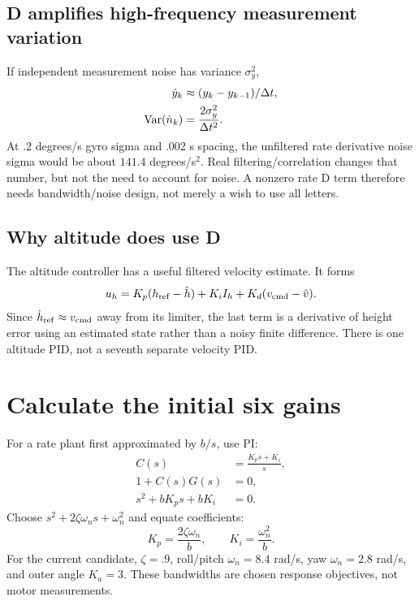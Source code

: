 \subsection{D amplifies high-frequency measurement variation}
If independent measurement noise has variance $\sigma_y^2$,
\begin{align}
\dot y_k&\approx(y_k-y_{k-1})/\Delta t,\\
\operatorname{Var}(\dot n_k)&=\frac{2\sigma_y^2}{\Delta t^2}.
\end{align}
At .2 degrees/s gyro sigma and .002 s spacing, the unfiltered rate derivative
noise sigma would be about $141.4$ degrees/s$^2$. Real filtering/correlation
changes that number, but not the need to account for noise. A nonzero rate D
term therefore needs bandwidth/noise design, not merely a wish to use all letters.

\subsection{Why altitude does use D}
The altitude controller has a useful filtered velocity estimate. It forms
\begin{equation}
u_h=K_p(h_{\rm ref}-\hat h)+K_iI_h+K_d(v_{\rm cmd}-\hat v).
\end{equation}
Since $\dot h_{\rm ref}\approx v_{\rm cmd}$ away from its limiter, the last term
is a derivative of height error using an estimated state rather than a noisy
finite difference. There is one altitude PID, not a seventh separate velocity PID.

\section{Calculate the initial six gains}
For a rate plant first approximated by $b/s$, use PI:
\begin{align}
C(s)&=\frac{K_ps+K_i}{s},\\
1+C(s)G(s)&=0,\\
s^2+bK_ps+bK_i&=0.
\end{align}
Choose $s^2+2\zeta\omega_ns+\omega_n^2$ and equate coefficients:
\begin{equation}
K_p=\frac{2\zeta\omega_n}{b},\qquad
K_i=\frac{\omega_n^2}{b}.
\end{equation}
For the current candidate, $\zeta=.9$, roll/pitch $\omega_n=8.4$ rad/s,
yaw $\omega_n=2.8$ rad/s, and outer angle $K_a=3$.
These bandwidths are chosen response objectives, not motor measurements.

